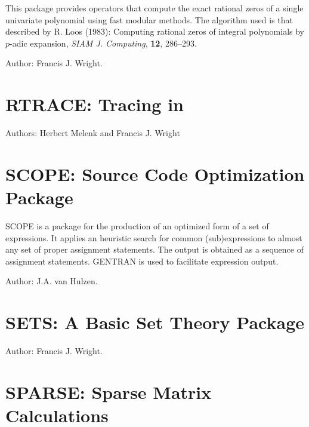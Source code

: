 
This package provides operators that compute the exact rational zeros
of a single univariate polynomial using fast modular methods.  The
algorithm used is that described by R. Loos (1983): Computing rational
zeros of integral polynomials by $p$-adic expansion, \textit{SIAM J.
Computing}, \textbf{12}, 286--293.

Author: Francis J. Wright.



\newpage
\section{RTRACE: Tracing in \REDUCE}

Authors: Herbert Melenk and Francis J. Wright



\newpage
\fi

\section{SCOPE: \REDUCE Source Code Optimization Package}
\label{SCOPE}

SCOPE is a package for the production of an optimized form of a set of
expressions.  It applies an heuristic search for common (sub)expressions
to almost any set of proper \REDUCE assignment statements.  The
output is obtained as a sequence of assignment statements.  GENTRAN is
used to facilitate expression output.

Author:  J.A. van Hulzen.


\newpage

\section{SETS: A Basic Set Theory Package}


Author: Francis J. Wright.



\newpage

\section{SPARSE: Sparse Matrix Calculations}

